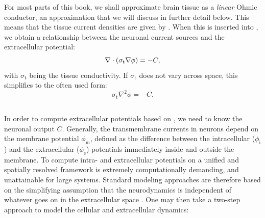 For most parts of this book, we shall approximate brain tissue as a \textit{linear} Ohmic conductor, an approximation that we will discuss in further detail below. This means that the tissue current densities are given by  . When this is inserted into , we obtain a relationship between the neuronal current sources and the extracellular potential: 
\begin{equation}
{\bf \nabla} \cdot \left(\sigma_\text{t} {\bf \nabla} {\phi} \right) = -C, 
\label{eq:Basics:continuity2}
\end{equation}
with $\sigma_\text{t}$ being the tissue conductivity. If $\sigma_\text{t}$ does not vary across space, this simplifies to the often used form:
\begin{equation}
\sigma_\text{t} \nabla^2{\phi} = -C.
\label{eq:Basics:continuity3}
\end{equation}



\subsection{}
\label{sec:Basics:twostep}
In order to compute extracellular potentials based on , we need to know the neuronal output $C$. Generally, the transmembrane currents in neurons depend on the membrane potential $\phi_\text{m}$, defined as the difference between the intracellular ($\phi_\text{i}$) and the extracellular ($\phi_\text{e}$) potentials immediately inside and outside the membrane. 
To compute intra- and extracellular potentials on a unified and spatially resolved framework 
is extremely computationally demanding, and unattainable for large systems. Standard modeling approaches are therefore based on the simplifying assumption that the neurodynamics is independent of whatever goes on in the extracellular space . 
One may then take a two-step approach to model the cellular and extracellular dynamics: 


